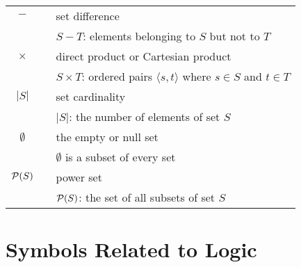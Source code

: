 \begin{tabular}{c|cl}
$-$
  & & set difference \\ 
  & & $S - T$: elements belonging to $S$ but not to $T$ \\ \hline
$\times$
  & & direct product or Cartesian product \\
  & & $S \times T$: ordered pairs $\langle s,t \rangle$ where $s \in S$ and $t \in T$ \\ \hline
$|S|$
  & & set cardinality \\
  & & $|S|$: the number of elements of set $S$ \\ \hline
$\emptyset$
  & & the empty or null set \\
  & & $\emptyset$ is a subset of every set \\ \hline
$\mbox{$\cal P$}(S)$
  & & power set \\
  & & $\mbox{$\cal P$}(S)$: the set of all subsets of set $S$ \\ \hline
\end{tabular}

\newpage

\section*{Symbols Related to Logic}

